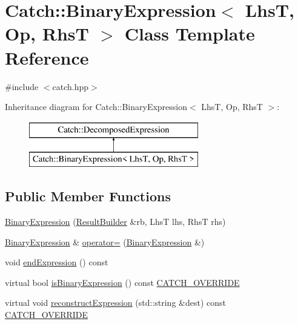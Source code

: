 \hypertarget{classCatch_1_1BinaryExpression}{\section{Catch\-:\-:Binary\-Expression$<$ Lhs\-T, Op, Rhs\-T $>$ Class Template Reference}
\label{classCatch_1_1BinaryExpression}
}


{\ttfamily \#include $<$catch.\-hpp$>$}

Inheritance diagram for Catch\-:\-:Binary\-Expression$<$ Lhs\-T, Op, Rhs\-T $>$\-:\begin{figure}[H]
\begin{center}
\leavevmode
\includegraphics[height=2.000000cm]{classCatch_1_1BinaryExpression}
\end{center}
\end{figure}
\subsection*{Public Member Functions}
\begin{DoxyCompactItemize}
\item 
\hyperlink{classCatch_1_1BinaryExpression_a0d81384761aba5f7a6d5f4fc7e7944f3}{Binary\-Expression} (\hyperlink{classCatch_1_1ResultBuilder}{Result\-Builder} \&rb, Lhs\-T lhs, Rhs\-T rhs)
\item 
\hyperlink{classCatch_1_1BinaryExpression}{Binary\-Expression} \& \hyperlink{classCatch_1_1BinaryExpression_a2147a858eb5866e5643d0ef321064aa1}{operator=} (\hyperlink{classCatch_1_1BinaryExpression}{Binary\-Expression} \&)
\item 
void \hyperlink{classCatch_1_1BinaryExpression_a480b1d75bbac51d1936aec7dad8c1cb1}{end\-Expression} () const 
\item 
virtual bool \hyperlink{classCatch_1_1BinaryExpression_a4c617c0b6a73a9cafbbf900909c7c258}{is\-Binary\-Expression} () const \hyperlink{catch_8hpp_a8ecdce4d3f57835f707915ae831eb847}{C\-A\-T\-C\-H\-\_\-\-O\-V\-E\-R\-R\-I\-D\-E}
\item 
virtual void \hyperlink{classCatch_1_1BinaryExpression_a6ed73ff9af9c229f9fa3d35d019f9e37}{reconstruct\-Expression} (std\-::string \&dest) const \hyperlink{catch_8hpp_a8ecdce4d3f57835f707915ae831eb847}{C\-A\-T\-C\-H\-\_\-\-O\-V\-E\-R\-R\-I\-D\-E}
\end{DoxyCompactItemize}


